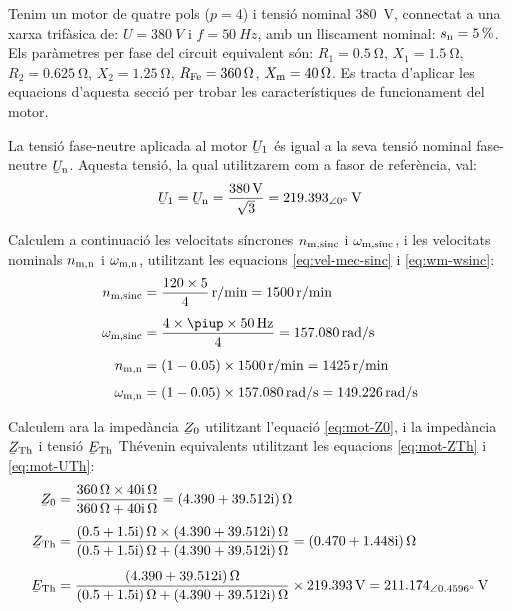 \begin{exemple}\label{ex:mot}
    Tenim un motor de quatre pols ($p=4$) i tensió nominal \qty{380}{V}, connectat a una xarxa trifàsica de: $U=\qty{380}{V}$ i $f=\qty{50}{Hz}$, amb un lliscament nominal: $s_\mathrm{n}=\qty{5}{\percent}$. Els paràmetres per fase del circuit equivalent són: $R_1=\qty{0,5}{\ohm}$, $X_1=\qty{1,5}{\ohm}$, $R_2=\qty{0,625}{\ohm}$, $X_2=\qty{1,25}{\ohm}$, $R_\mathrm{Fe}=\qty{360}{\ohm}$, $X_\mathrm{m}=\qty{40}{\ohm}$. Es tracta d'aplicar les equacions d'aquesta secció per trobar les característiques de funcionament del motor.

    La tensió fase-neutre aplicada al motor $\cmplx{U}_1$ és igual a la seva tensió nominal  fase-neutre  $\cmplx{U}\ped{n}$. Aquesta tensió, la qual utilitzarem com a fasor de referència, val:
    \[
        \cmplx{U}_1 = \cmplx{U}\ped{n} = \frac{\qty{380}{V}}{\sqrt{3}} = \qtypd{219,393}{0}{V}
    \]

    Calculem a continuació les velocitats síncrones $n_\mathrm{m,sinc}$ i $\omega_\mathrm{m,sinc}$, i les velocitats nominals $n_\mathrm{m,n}$ i $\omega_\mathrm{m,n}$, utilitzant les equacions \eqref{eq:vel-mec-sinc} i \eqref{eq:wm-wsinc}:
    \begin{align*}
        n\ped{m,sinc} &= \frac{120\times 5}{4} \, \unit{r/min} = \qty{1500}{r/min} \\[1ex]
        \omega\ped{m,sinc} &= \frac{4 \times\piup \times\qty{50}{Hz}}{4} =  \qty{157,080}{rad/s} \\[1ex]
        n\ped{m,n} &= (1-\num{0,05})\times \qty{1500}{r/min} = \qty{1425}{r/min} \\[1ex]
        \omega\ped{m,n} &= (1-\num{0,05}) \times\qty{157,080}{rad/s} = \qty{149,226}{rad/s}
    \end{align*}

    Calculem ara la impedància $\cmplx{Z}_0$ utilitzant l'equació \eqref{eq:mot-Z0}, i la impedància $\cmplx{Z}\ped{Th}$ i tensió $\cmplx{E}\ped{Th}$ Thévenin equivalents utilitzant les equacions \eqref{eq:mot-ZTh} i \eqref{eq:mot-UTh}:
     \begin{align*}
        \cmplx{Z}_0 &= \frac{\qty{360}{\ohm}\times\complexqty{j40}{\ohm}}{\qty{360}{\ohm}+\complexqty{j40}{\ohm}} = \complexqty{4,390+j39,512}{\ohm} \\[1ex]
        \cmplx{Z}\ped{Th} &= \frac{\complexqty{0,5+j1,5}{\ohm}\times\complexqty{4,390+j39,512}{\ohm}}
        {\complexqty{0,5+j1,5}{\ohm}+\complexqty{4,390+j39,512}{\ohm}} =  \complexqty{0,470+j1,448}{\ohm} \\[1ex]
        \cmplx{E}\ped{Th}  &= \frac{\complexqty{4,390+j39,512}{\ohm}}
        {\complexqty{0,5+j1,5}{\ohm}+\complexqty{4,390+j39,512}{\ohm}}\times\qty{219,393}{V} =  \qtypd{211,174}{0,4596}{V}
    \end{align*}


\end{exemple}

